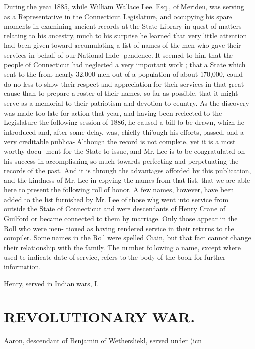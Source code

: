 \documentclass{book}
\begin{document}
During the year 1885, while William Wallace Lee, Esq., of 
Merideu, was serving as a Representative in the Connecticut 
Legislature, and occupying his spare moments in examining 
ancient records at the State Library in quest of matters relating 
to his ancestry, much to his surprise he learned that very little 
attention had been given toward accumulating a list of names of 
the men who gave their services in behalf of our National Inde- 
pendence. It seemed to him that the people of Connecticut had 
neglected a very important work ; that a State which sent to 
the front nearly 32,000 men out of a population of about 
170,000, could do no less to show their respect and appreciation 
for their services in that great cause than to prepare a roster of 
their names, so far as possible, that it might serve as a memorial 
to their patriotism and devotion to country. As the discovery 
was made too late for action that year, and having been reelected 
to the Legislature the following session of 1886, he caused a bill 
to be drawn, which he introduced and, after some delay, was, 
chiefly thi'ough his efforts, passed, and a very creditable publica- 
Although the record is not complete, yet it is a most worthy docu- 
ment for the State to issue, and Mr. Lee is to be congratulated 
on his success in accomplishing so much towards perfecting and 
perpetuating the records of the past. And it is through the 
advantages afforded by this publication, and the kindness of Mr. 
Lee in copying the names from that list, that we are able here to 
present the following roll of honor. A few names, however, 
have been added to the list furnished by Mr. Lee of those whg 
went into service from outside the State of Connecticut and were 
descendants of Henry Crane of Guilford or became connected to 
them by marriage. Only those appear in the Roll who were men- 
tioned as having rendered service in their returns to the compiler. 
Some names in the Roll were spelled Crain, but that fact cannot 
change their relationship with the family. The number following 
a name, except where used to indicate date of service, refers to 
the body of the book for further information. 

Henry, served in Indian wars, I. 



\section{REVOLUTIONARY WAR.}
Aaron, descendant of Benjamin of Wethersliekl, served under (icn 
\end{document}
